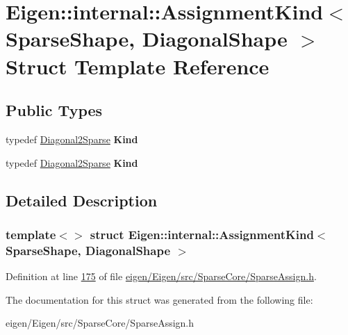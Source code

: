 \hypertarget{struct_eigen_1_1internal_1_1_assignment_kind_3_01_sparse_shape_00_01_diagonal_shape_01_4}{}\section{Eigen\+:\+:internal\+:\+:Assignment\+Kind$<$ Sparse\+Shape, Diagonal\+Shape $>$ Struct Template Reference}
\label{struct_eigen_1_1internal_1_1_assignment_kind_3_01_sparse_shape_00_01_diagonal_shape_01_4}
\subsection*{Public Types}
\begin{DoxyCompactItemize}
\item 
\mbox{\label{struct_eigen_1_1internal_1_1_assignment_kind_3_01_sparse_shape_00_01_diagonal_shape_01_4_a322a83d6eb9dfa1d733349a506002ef5}} 
typedef \hyperlink{struct_eigen_1_1internal_1_1_diagonal2_sparse}{Diagonal2\+Sparse} {\bfseries Kind}
\item 
\mbox{\label{struct_eigen_1_1internal_1_1_assignment_kind_3_01_sparse_shape_00_01_diagonal_shape_01_4_a322a83d6eb9dfa1d733349a506002ef5}} 
typedef \hyperlink{struct_eigen_1_1internal_1_1_diagonal2_sparse}{Diagonal2\+Sparse} {\bfseries Kind}
\end{DoxyCompactItemize}


\subsection{Detailed Description}
\subsubsection*{template$<$$>$\newline
struct Eigen\+::internal\+::\+Assignment\+Kind$<$ Sparse\+Shape, Diagonal\+Shape $>$}



Definition at line \hyperlink{eigen_2_eigen_2src_2_sparse_core_2_sparse_assign_8h_source_l00175}{175} of file \hyperlink{eigen_2_eigen_2src_2_sparse_core_2_sparse_assign_8h_source}{eigen/\+Eigen/src/\+Sparse\+Core/\+Sparse\+Assign.\+h}.



The documentation for this struct was generated from the following file\+:\begin{DoxyCompactItemize}
\item 
eigen/\+Eigen/src/\+Sparse\+Core/\+Sparse\+Assign.\+h\end{DoxyCompactItemize}
